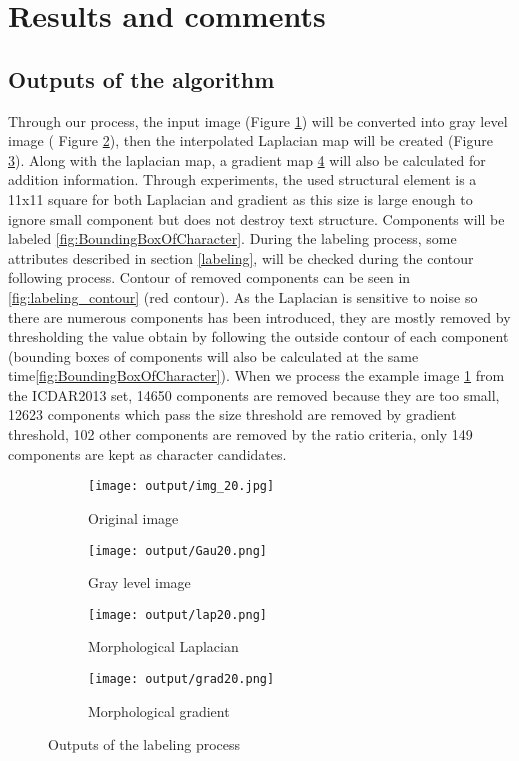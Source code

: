 \section{Results and comments}
\subsection{Outputs of the algorithm}
Through our process, the input image (Figure \ref{fig:inputImage}) will be converted into gray level image ( Figure \ref{fig:grayScale}), then the interpolated Laplacian map will be created (Figure \ref{fig:Laplacian}). Along with the laplacian map, a gradient map \ref{fig:gradient} will also be calculated for addition information. Through experiments, the used structural element is a 11x11 square for both Laplacian and gradient as this size is large enough to ignore small component but does not destroy text structure. Components will be labeled \ref{fig:BoundingBoxOfCharacter}. During the labeling process, some attributes described in section \ref{labeling}, will be checked during the contour following process. Contour of removed components can be seen in \ref{fig:labeling_contour} (red contour). As the Laplacian is sensitive to noise so there are numerous components has been introduced, they are mostly removed by thresholding the value obtain by following the outside contour of each component (bounding boxes of components will also be calculated at the same time\ref{fig:BoundingBoxOfCharacter}). When we process the example image \ref{fig:inputImage} from the ICDAR2013 set, 14650 components are removed because they are too small, 12623 components which pass the size threshold are removed by gradient threshold, 102 other components are removed by the ratio criteria, only 149 components are kept as character candidates. 


\begin{figure}

	\begin{subfigure}[b]{0.45\textwidth}
	 	\texttt{[image: output/img\_20.jpg]} \caption{Original image}\label{fig:inputImage} \end{subfigure}
	\begin{subfigure}[b]{0.45\textwidth}
	 	\texttt{[image: output/Gau20.png]} \caption{Gray level image}\label{fig:grayScale} \end{subfigure}	 	
\centering		
		
	\begin{subfigure}[b]{0.45\textwidth}
		\texttt{[image: output/lap20.png]}  \caption{Morphological Laplacian}\label{fig:Laplacian} \end{subfigure}	
	\begin{subfigure}[b]{0.45\textwidth}
		\texttt{[image: output/grad20.png]}  \caption{Morphological gradient}\label{fig:gradient} \end{subfigure}	
\centering

	\caption[Outputs of the labeling process] {Outputs of the labeling process}
	\label{fig:output}
\end{figure}



